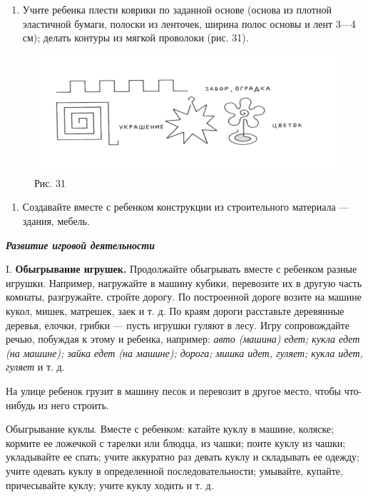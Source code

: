 \documentclass{book}
\renewcommand{\emph}[1]{\textit{#1}}
\begin{document}
\begin{enumerate}
\def\labelenumi{\arabic{enumi}.}
\setcounter{enumi}{6}
\item
  
  Учите ребенка плести коврики по заданной основе (основа из плотной
  эластичной бумаги, полоски из ленточек, ширина полос основы и лент
  3---4 см); делать контуры из мягкой проволоки (рис. 31).
  
\end{enumerate}


\begin{figure}
\centering
\includegraphics[width=\linewidth]{media/media/image28.png}
\caption*{Рис. 31}
\end{figure}


\begin{enumerate}
\def\labelenumi{\arabic{enumi}.}
\setcounter{enumi}{7}
\item
  
  Создавайте вместе с ребенком конструкции из строительного материала
  --- здания, мебель.
  
\end{enumerate}


\emph{\textbf{Развитие игровой деятельности}}

I. \textbf{Обыгрывание игрушек.} Продолжайте обыгрывать вместе с
ребенком разные игрушки. Например, нагружайте в машину кубики,
перевозите их в другую часть комнаты, разгружайте, стройте дорогу. По
построенной дороге возите на машине кукол, мишек, матрешек, заек и т. д.
По краям дороги расставьте деревянные деревья, елочки, грибки --- пусть
игрушки гуляют в лесу. Игру сопровождайте речью, побуждая к этому и
ребенка, например: \emph{авто (машина) едет; кукла едет (на машине);
зайка едет (на машине); дорога; мишка идет, гуляет; кукла идет, гуляет}
и т. д.

На улице ребенок грузит в машину песок и перевозит в другое место, чтобы
что-нибудь из него строить.

Обыгрывание куклы. Вместе с ребенком: катайте куклу в машине, коляске;
кормите ее ложечкой с тарелки или блюдца, из чашки; поите куклу из
чашки; укладывайте ее спать; учите аккуратно раз девать куклу и
складывать ее одежду; учите одевать куклу в определенной
последовательности; умывайте, купайте, причесывайте куклу; учите куклу
ходить и т. д.
\end{document}
